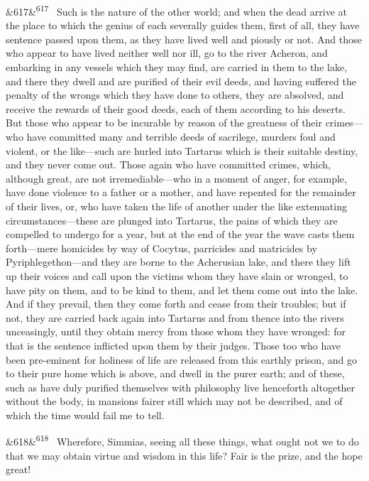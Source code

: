 \documentclass[12pt]{article}
\newcommand{\para}[1][]{\par\noindent\ifx&#1&\else\textsuperscript{\footnotesize #1}~\fi}
\begin{document}
\para[617] Such is the nature of the other world; and when the dead arrive at the place to which the genius of each severally guides them, first of all, they have sentence passed upon them, as they have lived well and piously or not. And those who appear to have lived neither well nor ill, go to the river Acheron, and embarking in any vessels which they may find, are carried in them to the lake, and there they dwell and are purified of their evil deeds, and having suffered the penalty of the wrongs which they have done to others, they are absolved, and receive the rewards of their good deeds, each of them according to his deserts. But those who appear to be incurable by reason of the greatness of their crimes---who have committed many and terrible deeds of sacrilege, murders foul and violent, or the like---such are hurled into Tartarus which is their suitable destiny, and they never come out. Those again who have committed crimes, which, although great, are not irremediable---who in a moment of anger, for example, have done violence to a father or a mother, and have repented for the remainder of their lives, or, who have taken the life of another under the like extenuating circumstances---these are plunged into Tartarus, the pains of which they are compelled to undergo for a year, but at the end of the year the wave casts them forth---mere homicides by way of Cocytus, parricides and matricides by Pyriphlegethon---and they are borne to the Acherusian lake, and there they lift up their voices and call upon the victims whom they have slain or wronged, to have pity on them, and to be kind to them, and let them come out into the lake. And if they prevail, then they come forth and cease from their troubles; but if not, they are carried back again into Tartarus and from thence into the rivers unceasingly, until they obtain mercy from those whom they have wronged: for that is the sentence inflicted upon them by their judges. Those too who have been pre-eminent for holiness of life are released from this earthly prison, and go to their pure home which is above, and dwell in the purer earth; and of these, such as have duly purified themselves with philosophy live henceforth altogether without the body, in mansions fairer still which may not be described, and of which the time would fail me to tell.

\para[618] Wherefore, Simmias, seeing all these things, what ought not we to do that we may obtain virtue and wisdom in this life? Fair is the prize, and the hope great!
\end{document}

